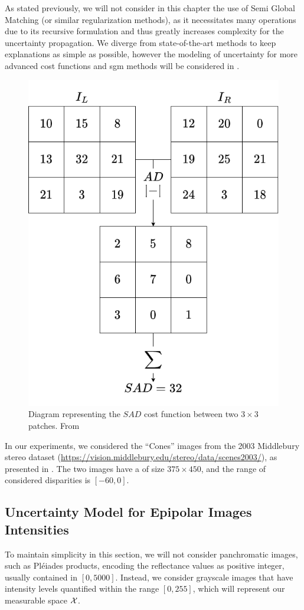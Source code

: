 As stated previously, we will not consider in this chapter the use of Semi Global Matching (or similar regularization methods), as it necessitates many operations due to its recursive formulation and thus greatly increases complexity for the uncertainty propagation. We diverge from state-of-the-art methods to keep explanations as simple as possible, however the modeling of uncertainty for more advanced cost functions and \acrshort{sgm} methods will be considered in .

\begin{figure}
    \centering
    \includegraphics[width=0.5\linewidth]{Images/Chap_4/SAD.png}
    \caption{Diagram representing the $SAD$ cost function between two $3\times3$ patches. From \cite{malinowski_uncertainty_2024}}
    \label{fig:SAD}
\end{figure}

In our experiments, we considered the ``Cones'' images from the 2003 Middlebury stereo dataset (\url{https://vision.middlebury.edu/stereo/data/scenes2003/}), as presented in . The two images have a of size $375 \times 450$, and the range of considered disparities is $[-60, 0]$.

\subsection{Uncertainty Model for Epipolar Images Intensities}
To maintain simplicity in this section, we will not consider panchromatic images, such as Pléiades products, encoding the reflectance values as positive integer, usually contained in $[0, 5000]$. Instead, we consider grayscale images that have intensity levels quantified within the range $[0, 255]$, which will represent our measurable space $\mathcal{X}$.


